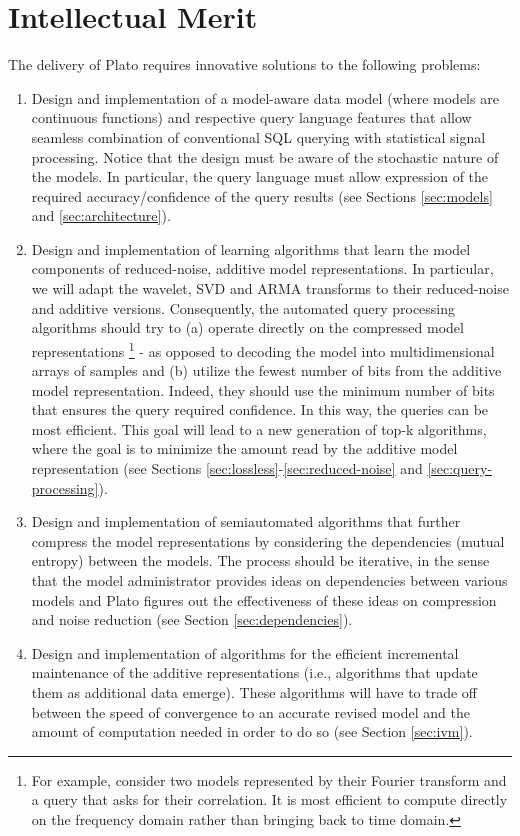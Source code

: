 \section{Intellectual Merit}
\label{sec:merit}
The delivery of Plato requires innovative solutions to the following problems:
%
\begin{enumerate}
%
\item Design and implementation of a model-aware data model (where models are continuous functions) and respective query language features that allow seamless combination of conventional SQL querying with statistical signal processing. Notice that the design must be aware of the stochastic nature of the models. In particular, the query language must allow expression of the required accuracy/confidence of the query results (see Sections \ref{sec:models} and \ref{sec:architecture}).
%
\item Design and implementation of learning algorithms that learn the model components of reduced-noise, additive model representations. In particular, we will adapt the wavelet, SVD and ARMA transforms to their reduced-noise and additive versions. Consequently, the automated query processing algorithms should try to (a) operate directly on the compressed model representations%
\footnote{
For example, consider two models represented by their Fourier transform and a query that asks for their correlation. It is most efficient to compute directly on the frequency domain rather than bringing back to time domain.
} - as opposed to decoding the model into multidimensional arrays of samples and (b) utilize the fewest number of bits from the additive model representation. Indeed, they should use the minimum number of bits that ensures the query required confidence. In this way, the queries can be most efficient. This goal will lead to a new generation of top-k algorithms, where the goal is to minimize the amount read by the additive model representation (see Sections \ref{sec:lossless}-\ref{sec:reduced-noise} and \ref{sec:query-processing}).
%
\item Design and implementation of semiautomated algorithms that further compress the model representations by considering the dependencies (mutual entropy) between the models. The process should be iterative, in the sense that the model administrator provides ideas on dependencies between various models and Plato figures out the effectiveness of these ideas on compression and noise reduction (see Section \ref{sec:dependencies}).
%
\item Design and implementation of algorithms for the efficient incremental maintenance of the additive representations (i.e., algorithms that update them as additional data emerge). These algorithms will have to trade off between the speed of convergence to an accurate revised model and the amount of computation needed in order to do so (see Section \ref{sec:ivm}).

\end{enumerate}
